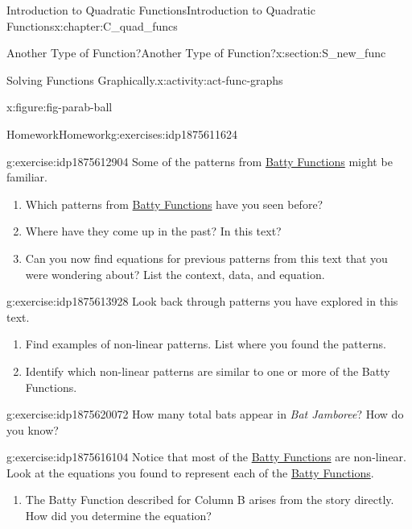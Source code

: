 \documentclass[oneside,10pt,]{book}
\newcommand{\pubtitle}[1]{\textsl{#1}}
\numberwithin{equation}{chapter}
\begin{document}
\begin{chapterptx}{Introduction to Quadratic Functions}{}{Introduction to Quadratic Functions}{}{}{x:chapter:C_quad_funcs}
\begin{sectionptx}{Another Type of Function?}{}{Another Type of Function?}{}{}{x:section:S_new_func}
\begin{activity}{Solving Functions Graphically.}{x:activity:act-func-graphs}
\begin{figureptx}{}{x:figure:fig-parab-ball}{}
\begin{image}{0.25}{0.5}{0.25}
\end{image}%
\tcblower
\end{figureptx}%
\end{activity}%
%
%
\typeout{************************************************}
\typeout{************************************************}
%
\begin{exercises-subsection}{Homework}{}{Homework}{}{}{g:exercises:idp1875611624}
\begin{divisionexercise}{1}{}{}{g:exercise:idp1875612904}%
Some of the patterns from \hyperref[x:worksheet:act-batty-func]{Batty Functions} might be familiar.%
\begin{enumerate}[font=\bfseries,label=(\alph*),ref=\alph*]
\item{}Which patterns from \hyperref[x:worksheet:act-batty-func]{Batty Functions} have you seen before?%
\item{}Where have they come up in the past? In this text?%
\item{}Can you now find equations for previous patterns from this text that you were wondering about? List the context, data, and equation.%
\end{enumerate}
\end{divisionexercise}%
\begin{divisionexercise}{2}{}{}{g:exercise:idp1875613928}%
Look back through patterns you have explored in this text.%
\begin{enumerate}[font=\bfseries,label=(\alph*),ref=\alph*]
\item{}Find examples of non-linear patterns. List where you found the patterns.%
\item{}Identify which non-linear patterns are similar to one or more of the Batty Functions.%
\end{enumerate}
\end{divisionexercise}%
\begin{divisionexercise}{3}{}{}{g:exercise:idp1875620072}%
How many total bats appear in \pubtitle{Bat Jamboree}? How do you know?%
\end{divisionexercise}%
\begin{divisionexercise}{4}{}{}{g:exercise:idp1875616104}%
Notice that most of the \hyperref[x:worksheet:act-batty-func]{Batty Functions} are non-linear. Look at the equations you found to represent each of the \hyperref[x:worksheet:act-batty-func]{Batty Functions}.%
\begin{enumerate}[font=\bfseries,label=(\alph*),ref=\alph*]
\item{}The Batty Function described for Column B arises from the story directly. How did you determine the equation?%

\end{enumerate}
\end{divisionexercise}
\end{exercises-subsection}
\end{sectionptx}
\end{chapterptx}
\end{document}
